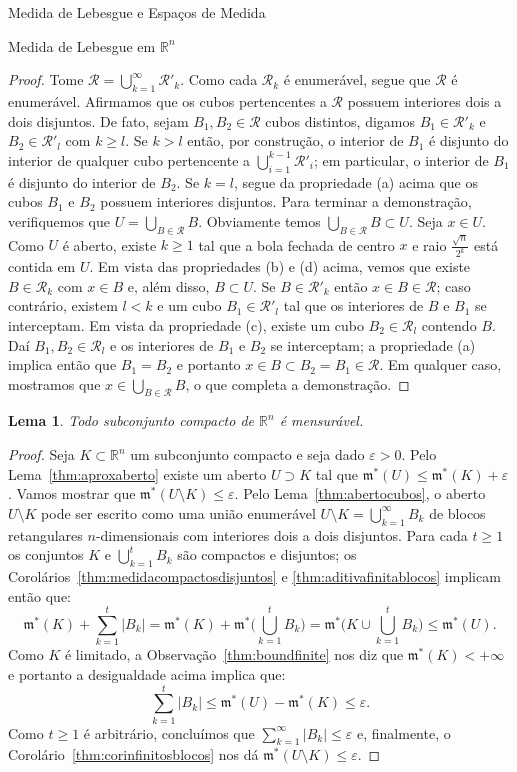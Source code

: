 \documentclass[oneside,final,11pt]{amsbook}
\newcommand{\R}{\mathds R}
\newcommand{\leb}{\mathfrak m}
\theoremstyle{remark}\newtheorem{exercise}{Exercício}[chapter]
\theoremstyle{remark}\newtheorem{*exercise}[exercise]{\hbox to 0pt{\hskip 0pt minus 1fil*}Exercício}
\theoremstyle{definition}\newtheorem{exdefin}{Definição}[chapter]
\theoremstyle{plain}\newtheorem{teo}{Teorema}[section]
\theoremstyle{plain}\newtheorem{lem}[teo]{Lema}
\theoremstyle{plain}\newtheorem{prop}[teo]{Proposição}
\theoremstyle{plain}\newtheorem{cor}[teo]{Corolário}
\theoremstyle{definition}\newtheorem{defin}[teo]{Definição}
\theoremstyle{remark}\newtheorem{rem}[teo]{Observação}
\theoremstyle{definition}\newtheorem{notation}[teo]{Notação}
\theoremstyle{definition}\newtheorem{convention}[teo]{Convenção}
\theoremstyle{definition}\newtheorem{example}[teo]{Exemplo}
\numberwithin{section}{chapter}
\numberwithin{equation}{section}
\begin{document}
\begin{chapter}{Medida de Lebesgue e Espaços de Medida}
\begin{section}[Medida de Lebesgue em $\R^n$]{Medida de Lebesgue em ${\R^n}$}
\begin{proof}
Tome $\mathcal R=\bigcup_{k=1}^\infty\mathcal R'_k$. Como cada $\mathcal R_k$ é enumerável, segue que $\mathcal R$ é enumerável.
Afirmamos que os cubos pertencentes a $\mathcal R$ possuem interiores dois a dois disjuntos.
De fato, sejam $B_1,B_2\in\mathcal R$ cubos distintos, digamos $B_1\in\mathcal R'_k$ e $B_2\in\mathcal R'_l$ com $k\ge l$.
Se $k>l$ então, por construção, o interior de $B_1$ é disjunto do interior de qualquer cubo pertencente a
$\bigcup_{i=1}^{k-1}\mathcal R'_i$; em particular, o interior de $B_1$ é disjunto do interior de $B_2$.
Se $k=l$, segue da propriedade (a) acima que os cubos $B_1$ e $B_2$ possuem interiores disjuntos.
Para terminar a demonstração, verifiquemos que $U=\bigcup_{B\in\mathcal R}B$. Obviamente temos $\bigcup_{B\in\mathcal R}B\subset U$.
Seja $x\in U$. Como $U$ é aberto, existe $k\ge1$ tal que a bola fechada de centro $x$ e raio $\frac{\sqrt n}{2^k}$
está contida em $U$. Em vista das propriedades (b) e (d) acima, vemos que existe $B\in\mathcal R_k$ com $x\in B$ e,
além disso, $B\subset U$. Se $B\in\mathcal R'_k$ então $x\in B\in\mathcal R$; caso contrário, existem $l<k$ e um cubo
$B_1\in\mathcal R'_l$ tal que os interiores de $B$ e $B_1$ se interceptam. Em vista da propriedade (c), existe um cubo
$B_2\in\mathcal R_l$ contendo $B$. Daí $B_1,B_2\in\mathcal R_l$ e os interiores de $B_1$ e $B_2$ se interceptam;
a propriedade (a) implica então que $B_1=B_2$ e portanto $x\in B\subset B_2=B_1\in\mathcal R$. Em qualquer caso,
mostramos que $x\in\bigcup_{B\in\mathcal R}B$, o que completa a demonstração.
\end{proof}

\begin{lem}
Todo subconjunto compacto de $\R^n$ é mensurável.
\end{lem}
\begin{proof}
Seja $K\subset\R^n$ um subconjunto compacto e seja dado $\varepsilon>0$. Pelo Lema~\ref{thm:aproxaberto} existe
um aberto $U\supset K$ tal que $\leb^*(U)\le\leb^*(K)+\varepsilon$. Vamos mostrar que $\leb^*(U\setminus K)\le\varepsilon$.
Pelo Lema~\ref{thm:abertocubos}, o aberto $U\setminus K$ pode ser escrito como uma união enumerável $U\setminus K=\bigcup_{k=1}^\infty B_k$
de blocos retangulares $n$-dimensionais com interiores dois a dois disjuntos. Para cada $t\ge1$
os conjuntos $K$ e $\bigcup_{k=1}^tB_k$ são compactos e disjuntos; os Corolários~\ref{thm:medidacompactosdisjuntos}
e \ref{thm:aditivafinitablocos} implicam então que:
\[\leb^*(K)+\sum_{k=1}^t\vert B_k\vert=\leb^*(K)+\leb^*\Big(\bigcup_{k=1}^tB_k\Big)
=\leb^*\Big(K\cup\bigcup_{k=1}^tB_k\Big)\le\leb^*(U).\]
Como $K$ é limitado,
a Observação~\ref{thm:boundfinite} nos diz que $\leb^*(K)<+\infty$ e portanto a desigualdade acima implica que:
\[\sum_{k=1}^t\vert B_k\vert\le\leb^*(U)-\leb^*(K)\le\varepsilon.\]
Como $t\ge1$ é arbitrário, concluímos que $\sum_{k=1}^\infty\vert B_k\vert\le\varepsilon$
e, finalmente, o Corolário~\ref{thm:corinfinitosblocos} nos dá $\leb^*(U\setminus K)\le\varepsilon$.
\end{proof}


\end{section}
\end{chapter}
\end{document}
